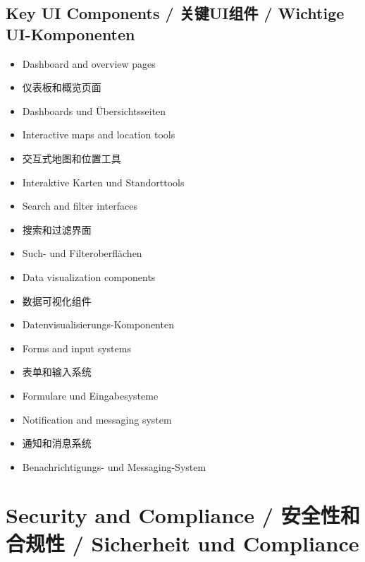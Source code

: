 \subsection{Key UI Components / 关键UI组件 / Wichtige UI-Komponenten}
\begin{itemize}
    \item Dashboard and overview pages
    \item 仪表板和概览页面
    \item Dashboards und Übersichtsseiten
    \item Interactive maps and location tools
    \item 交互式地图和位置工具
    \item Interaktive Karten und Standorttools
    \item Search and filter interfaces
    \item 搜索和过滤界面
    \item Such- und Filteroberflächen
    \item Data visualization components
    \item 数据可视化组件
    \item Datenvisualisierungs-Komponenten
    \item Forms and input systems
    \item 表单和输入系统
    \item Formulare und Eingabesysteme
    \item Notification and messaging system
    \item 通知和消息系统
    \item Benachrichtigungs- und Messaging-System
\end{itemize}

\section{Security and Compliance / 安全性和合规性 / Sicherheit und Compliance}

